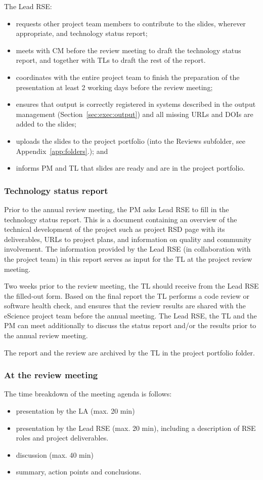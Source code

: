 \documentclass[11pt]{article}
\begin{document}
The Lead RSE:
\begin{itemize}
\item requests other project team members to contribute to the slides, wherever appropriate, and technology status report;
\item meets with CM before the review meeting to draft the technology status report, and together with TLs to draft the rest
of the report.
\item coordinates with the entire project team to finish the preparation of the presentation at least 2 working days before
the review meeting;
\item ensures that output is correctly registered in systems described in the output management (Section~\ref{sec:exec:output}) 
  and all missing URLs and DOIs are added to the slides;
\item uploads the slides to the project portfolio (into the Reviews subfolder, see Appendix~\ref{app:folders}.); and
\item informs PM and TL that slides are ready and are in the project portfolio.
\end{itemize}

\subsubsection{Technology status report}
\label{sec:exec:tech}
Prior to the annual review meeting, the PM asks Lead RSE to fill in the technology status report. This is a document
containing an overview of the technical development of the project such as project RSD page with its deliverables, URLs
to project plans, and information on quality and community involvement. The information provided by the Lead RSE (in
collaboration with the project team) in this report serves as input for the TL at the project review meeting.

Two weeks prior to the review meeting, the TL should receive from the Lead RSE the filled-out
form. Based on the final report the TL performs a code review or software health check, and ensures that the review
results are shared with the eScience project team before the annual meeting. The Lead RSE, the TL and the PM can meet
additionally to discuss the status report and/or the results prior to the annual review meeting.

The report and the review are archived by the TL in the project portfolio folder.

\subsubsection{At the review meeting}
The time breakdown of the meeting agenda is follows:
\begin{itemize}
\item presentation by the LA (max. 20 min)
\item presentation by the Lead RSE (max. 20 min), including a description of RSE roles and project deliverables.
\item discussion (max. 40 min)
\item summary, action points and conclusions.
\end{itemize}
\end{document}
